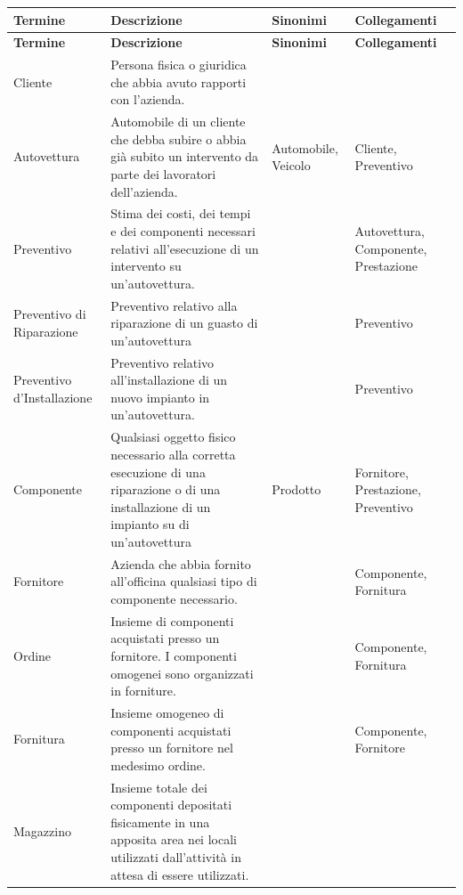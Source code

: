 		\begin{longtable}{| p{2.5cm} | p{4.5cm} | p{2cm} | p{2.5cm} |}
				
			\hline
			\textbf{Termine} & 
			\textbf{Descrizione} & 
			\textbf{Sinonimi} & 
			\textbf{Collegamenti} \\
			
			\endfirsthead
				
			\hline
			\textbf{Termine} & 
			\textbf{Descrizione} & 
			\textbf{Sinonimi} & 
			\textbf{Collegamenti} \\
			
			\endhead
			
			\hline
			Cliente & 
			Persona fisica o giuridica che abbia avuto rapporti con l'azienda.
			&&\\ \hline
			Autovettura &
			Automobile di un cliente che debba subire o abbia già subito un intervento da parte dei lavoratori dell’azienda. &
			Automobile, Veicolo &
			Cliente, Preventivo
			\\ \hline
			Preventivo &
			Stima dei costi, dei tempi e dei componenti necessari relativi all’esecuzione di un intervento su un’autovettura. & &
			Autovettura, Componente, Prestazione
			\\ \hline
			Preventivo di Riparazione &
			Preventivo relativo alla riparazione di un guasto di un’autovettura & &
			Preventivo 
			\\ \hline
			Preventivo d'Installazione & 
			Preventivo relativo all’installazione di un nuovo impianto in un’autovettura. & &
			Preventivo
			\\ \hline
			Componente &
			Qualsiasi oggetto fisico necessario alla corretta esecuzione di una riparazione o di una installazione di un impianto su di un’autovettura &
			Prodotto &
			Fornitore, Prestazione, Preventivo
			\\ \hline
			Fornitore & 
			Azienda che abbia fornito all’officina qualsiasi tipo di componente necessario. & &
			Componente, Fornitura
			\\ \hline
			Ordine &
			Insieme di componenti acquistati presso un fornitore. I componenti omogenei sono organizzati in forniture. &
			&
			Componente, Fornitura
			\\ \hline
			Fornitura & 
			Insieme omogeneo di componenti acquistati presso un fornitore nel medesimo ordine. &
			&
			Componente, Fornitore
			\\ \hline
			Magazzino &
			Insieme totale dei componenti depositati fisicamente in una apposita area nei locali utilizzati dall'attività in attesa di essere utilizzati. &

\end{longtable}

